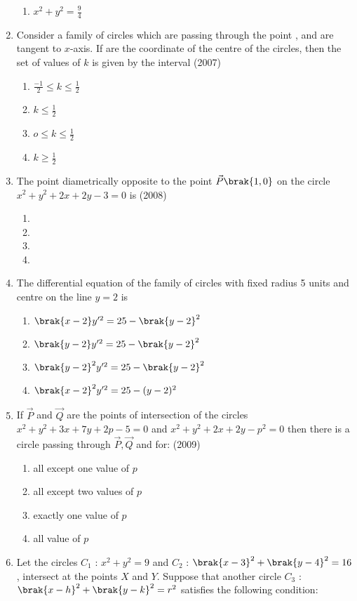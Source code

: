 \begin{enumerate}
\begin{multicols}{2}
\begin{enumerate}
\item $x^2+y^2=\frac{9}{4}$
\end{enumerate}
\end{multicols}
\item Consider a family of circles which are passing through the point ,  and are tangent to $x$-axis. If  are the coordinate of the centre of the circles,  then the set of values of $k$ is given by the interval
\hfill{(2007)}
\begin{multicols}{2}
\begin{enumerate}
\item $\frac{-1}{2} \le k \le \frac{1}{2}$
\item $k \le \frac{1}{2}$
\item $o \le k \le \frac{1}{2}$
\item $k \ge \frac{1}{2}$
\end{enumerate}
\end{multicols}
\item The point diametrically opposite to the point $\vec{P}\brak{1, 0}$ on the circle $x^2+y^2+2x+2y-3=0$ is 
\hfill{(2008)}
\begin{multicols}{2}
\begin{enumerate}
\item {}
\item {}
\item {}
\item {}
\end{enumerate}
\end{multicols}
\item The differential equation of the family of circles with fixed radius 5 units and centre on the line $y=2$ is
\begin{enumerate}
\item $\brak{x-2}y^{\prime 2}=25-\brak{y-2}^2$
\item $\brak{y-2}y^{\prime 2}=25-\brak{y-2}^2$
\item $\brak{y-2}^2y^{\prime 2}=25-\brak{y-2}^2$
\item $\brak{x-2}^2y^{\prime 2}=25-(y-2)^2$
\end{enumerate}
\item If $\vec{P}$ and $\vec{Q}$ are the points of intersection of the circles $x^2+y^2+3x+7y+2p-5=0$ and $x^2+y^2+2x+2y-p^2=0$ then there is a circle passing through $\vec{P},  \vec{Q}$ and  for:
\hfill{(2009)}
\begin{enumerate}
\item all except one value of $p$
\item all except two values of $p$
\item exactly one value of $p$
\item all value of $p$
\end{enumerate}
    \item Let the circles $C_{1}$ : $x^2+y^2=9$ and $C_{2}$ : $\brak{x-3}^2+\brak{y-4}^2 = 16$,  intersect at the points $X$ and $Y$. Suppose that another circle $C_{3}$ : $\brak{x-h}^2+\brak{y-k}^2=r^2$ satisfies the following condition:\\
 

\end{enumerate}
